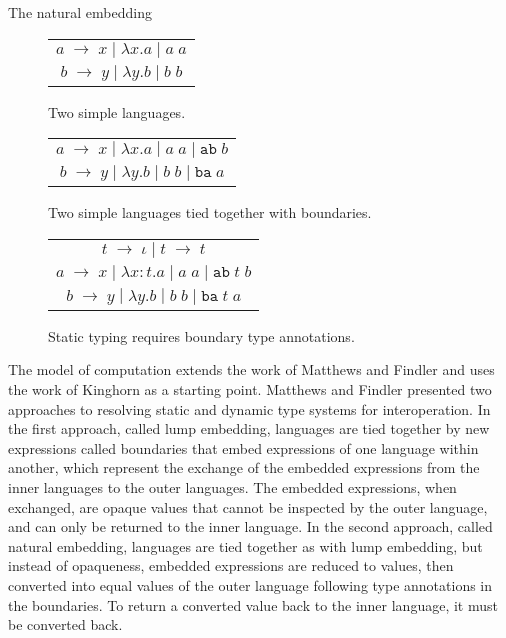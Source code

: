 The natural embedding 

\begin{figure}[t]
\onehalfspacing
\centering
\begin{tabular}{c}
$a \; \rightarrow \; x \; | \; \lambda x.a \; | \; a \; a$ \\
$b \; \rightarrow \; y \; | \; \lambda y.b \; | \; b \; b$
\end{tabular}
\caption{Two simple languages.}
\label{figsim}
\end{figure}

\begin{figure}[t]
\onehalfspacing
\centering
\begin{tabular}{c}
$a \; \rightarrow \; x \; | \; \lambda x.a \; | \; a \; a \; | \; \mathtt{ab} \; b$ \\
$b \; \rightarrow \; y \; | \; \lambda y.b \; | \; b \; b \; | \; \mathtt{ba} \; a$
\end{tabular}
\caption{Two simple languages tied together with boundaries.}
\label{figtie}
\end{figure}

\begin{figure}[b]
\onehalfspacing
\centering
\begin{tabular}{c}
$t \; \rightarrow \; \iota \; | \; t \; \rightarrow \; t$ \\
$a \; \rightarrow \; x \; | \; \lambda x:t.a \; | \; a \; a \; | \; \mathtt{ab} \; t \; b$ \\
$b \; \rightarrow \; y \; | \; \lambda y.b \; | \; b \; b \; | \; \mathtt{ba} \; t \; a$
\end{tabular}
\caption{Static typing requires boundary type annotations.}
\label{figann}
\end{figure}

The model of computation extends the work of Matthews and Findler \cite{matthews07} and uses the work of Kinghorn \cite{kinghorn07} as a starting point. Matthews and Findler presented \cite{matthews07} two approaches to resolving static and dynamic type systems for interoperation. In the first approach, called lump embedding, languages are tied together by new expressions called boundaries that embed expressions of one language within another, which represent the exchange of the embedded expressions from the inner languages to the outer languages. The embedded expressions, when exchanged, are opaque values that cannot be inspected by the outer language, and can only be returned to the inner language. In the second approach, called natural embedding, languages are tied together as with lump embedding, but instead of opaqueness, embedded expressions are reduced to values, then converted into equal values of the outer language following type annotations in the boundaries. To return a converted value back to the inner language, it must be converted back.


